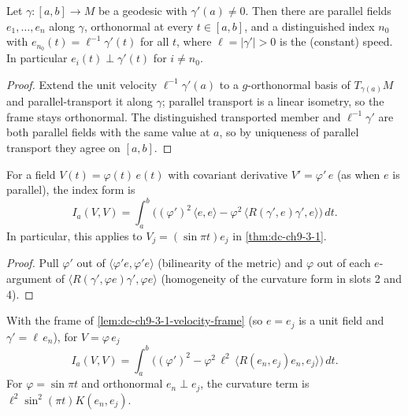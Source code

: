 \begin{lemma}
  \label{lem:dc-ch9-3-1-velocity-frame}
  \leanok
  Let $\gamma:[a,b]\to M$ be a geodesic with $\gamma'(a)\ne 0$. Then there are parallel fields
  $e_1,\dots,e_n$ along $\gamma$, orthonormal at every $t\in[a,b]$, and a distinguished index
  $n_0$ with $e_{n_0}(t)=\ell^{-1}\gamma'(t)$ for all $t$, where $\ell=|\gamma'|>0$ is the
  (constant) speed. In particular $e_i(t)\perp\gamma'(t)$ for $i\ne n_0$.
\end{lemma}
\begin{proof}
  \leanok
  \sketch
  Extend the unit velocity $\ell^{-1}\gamma'(a)$ to a $g$-orthonormal basis of $T_{\gamma(a)}M$
  and parallel-transport it along $\gamma$; parallel transport is a linear isometry, so the frame
  stays orthonormal. The distinguished transported member and $\ell^{-1}\gamma'$ are both parallel
  fields with the same value at $a$, so by uniqueness of parallel transport they agree on
  $[a,b]$.
\end{proof}
\begin{lemma}
  \label{lem:dc-ch9-3-1-index-form-scaled}
  \leanok
  For a field $V(t)=\varphi(t)\,e(t)$ with covariant derivative $V'=\varphi'\,e$ (as when $e$ is
  parallel), the index form is
  $$I_a(V,V)=\int_a^b\Big((\varphi')^2\,\langle e,e\rangle
    -\varphi^2\,\langle R(\gamma',e)\gamma',e\rangle\Big)\,dt.$$
  In particular, this applies to $V_j=(\sin\pi t)e_j$ in
  \cref{thm:dc-ch9-3-1}.
\end{lemma}
\begin{proof}
  \leanok
  \sketch
  Pull $\varphi'$ out of $\langle\varphi' e,\varphi' e\rangle$ (bilinearity of the metric) and
  $\varphi$ out of each $e$-argument of $\langle R(\gamma',\varphi e)\gamma',\varphi e\rangle$
  (homogeneity of the curvature form in slots 2 and 4).
\end{proof}
\begin{lemma}
  \label{lem:dc-ch9-3-1-index-form-frame}
  \leanok
  With the frame of \cref{lem:dc-ch9-3-1-velocity-frame} (so $e=e_j$ is a unit field and
  $\gamma'=\ell\,e_n$), for $V=\varphi\,e_j$
  $$I_a(V,V)=\int_a^b\Big((\varphi')^2-\varphi^2\,\ell^2\,\langle R(e_n,e_j)e_n,e_j\rangle\Big)\,dt.$$
  For $\varphi=\sin\pi t$ and orthonormal $e_n\perp e_j$, the curvature
  term is $\ell^2\sin^2(\pi t)K(e_n,e_j)$.
\end{lemma}
